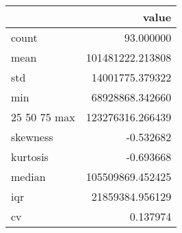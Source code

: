 \begin{tabular}{lr}
\toprule
 & value \\
\midrule
count & 93.000000 \\
mean & 101481222.213808 \\
std & 14001775.379322 \\
min & 68928868.342660 \\
25%
50%
75%
max & 123276316.266439 \\
skewness & -0.532682 \\
kurtosis & -0.693668 \\
median & 105509869.452425 \\
iqr & 21859384.956129 \\
cv & 0.137974 \\
\bottomrule
\end{tabular}
